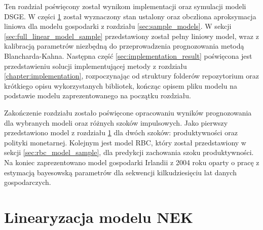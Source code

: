 
Ten rozdział poświęcony został wynikom implementacji oraz symulacji modeli DSGE. W części \ref{sec:results:model} został wyznaczony stan ustalony oraz obczliona aproksymacja liniowa dla modelu gospodarki z rozdziału \ref{sec:sample_models}. W sekcji \ref{sec:full_linear_model_sample} przedstawiony został pełny liniowy model, wraz z kalibracją parametrów niezbędną do przeprowadzenia prognozowania metodą Blancharda-Kahna. Następna część \ref{sec:implementation_result} poświęcona jest przedstawieniu solucji implementującej metody z rozdziału \ref{chapter:implementation}, rozpoczynając od struktury folderów repozytorium oraz krótkiego opisu wykorzystanych bibliotek, kończąc opisem pliku modelu na podstawie modelu zaprezentowanego na początku rozdziału.

Zakończenie rozdziału zostało poświęcone opracowaniu wyników prognozowania dla wybranych modeli oraz różnych szoków impulsowych. Jako pierwszy przedstawiono model z rozdziału \ref{sec:results:model} dla dwóch szoków: produktywności oraz polityki monetarnej. Kolejnym jest model RBC, który został przedstawiony w sekcji \ref{sec:rbc_model_sample}, dla predykcji zachowania szoku produktywności. Na koniec zaprezentowano model gospodarki Irlandii z 2004 roku oparty o pracę \cite{NBERw10309} z estymacją bayesowską parametrów dla sekwencji kilkudziesięciu lat danych gospodarczych.

\section{Linearyzacja modelu NEK}
\label{sec:results:model}

